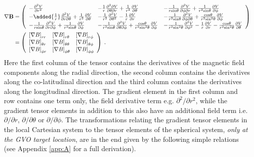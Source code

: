 \documentclass[extra,mreferee]{gji}
\begin{document}
\begin{align}
\nabla \mathbf{B} &= \left(
\begin{array}{lll}
-\frac{\partial^2 V}{\partial r^2}         & -\frac{1}{r}\frac{\partial^2\partial V}{\partial \theta \partial r}+\frac{1}{r^2}\frac{\partial V}{\partial \theta} & -\frac{1}{r\mathrm{sin}\theta}\frac{\partial^2 V}{\partial \phi \partial r}+\frac{1}{r^2 \mathrm{sin}\theta}\frac{\partial V}{\partial \phi}
 \\
-\added{\frac{1}{r}}\frac{\partial^2 V}{\partial r \partial \theta}+\frac{1}{r^2}\frac{\partial V}{\partial \theta}  & -\frac{1}{r^2}\frac{\partial^2 V}{\partial \theta^2}-\frac{1}{r} \frac{\partial V}{\partial r} & -\frac{1}{r^2 \mathrm{sin}\theta}\frac{\partial^2 V}{\partial \phi \partial \theta}+\frac{\mathrm{cos}\theta}{r^2 \mathrm{sin}^2\theta}\frac{\partial V}{\partial \phi}  \\
-\frac{1}{r \mathrm{sin}\theta} \frac{\partial^2 V}{\partial r \partial \phi}+\frac{1}{r^2 \mathrm{sin}\theta}\frac{\partial V}{\partial \phi}  & -\frac{1}{r^2 \mathrm{sin}\theta}\frac{\partial^2 V}{\partial \theta \partial \phi}+\frac{\mathrm{cos}\theta}{r^2 \mathrm{sin}^2\theta} \frac{\partial V}{\partial \phi} & -\frac{1}{r^2 \mathrm{sin}^2\theta}\frac{\partial^2 V}{\partial \phi^2}-\frac{1}{r}\frac{\partial V}{\partial r}-\frac{\mathrm{cos}\theta}{r^2 \mathrm{sin}^2\theta}\frac{\partial V}{\partial \theta}
\end{array}\right) \nonumber \\
&= \left(
\begin{array}{lll}
\left[\nabla B\right]_{rr}        & \left[\nabla B\right]_{r\theta}       & \left[\nabla B\right]_{r \phi}  \\
\left[\nabla B\right]_{\theta r}  & \left[\nabla B\right]_{\theta \theta} & \left[ \nabla B\right]_{\theta \phi} \\
\left[\nabla B\right]_{\phi r}    & \left[\nabla B\right]_{\phi \theta}   & \left[\nabla B\right]_{\phi \phi} 
\end{array}\right) \;. \label{eq:tensor_spherical}
\end{align} 
Here the first column of the tensor contains the derivatives of the magnetic field components along the radial direction, the second column contains the derivatives along the co-latitudinal direction and the third column contains the derivatives along the longitudinal direction. The gradient element in the first column and row contains one term only, the field derivative term e.g. $\partial^2/\partial r^2$, while the  gradient tensor elements in addition to this also have an additional field term i.e. $\partial/\partial r$, $\partial/\partial \theta$ or $\partial/\partial \phi$.  The transformations relating the gradient tensor elements in the local Cartesian system to the tensor elements of the spherical system,  {\it only at the GVO target location}, are in the end given by the following simple relations (see Appendix \ref{app:A} for a full derivation).
\end{document}
